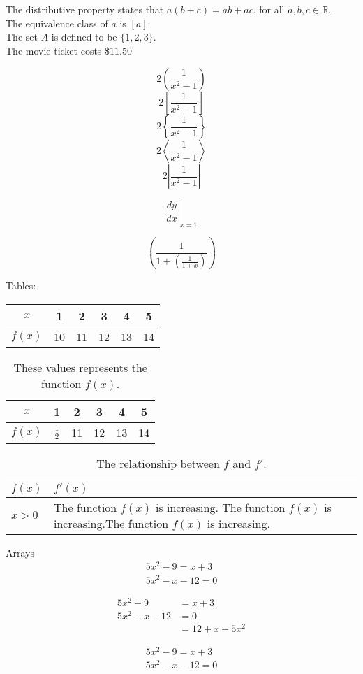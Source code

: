 \documentclass[11pt]{article}
\begin{document}
The distributive property states that $a(b+c)=ab +ac$, for all
$a,b, c \in \mathbb{R}$.\\[6pt] 
The equivalence class of $a$ is $[a]$.\\[6pt]
The set $A$ is defined to be $\{1, 2, 3\}$.\\[6pt]
The movie ticket costs $\$11.50$  %

$$2\left(\frac{1}{x^2-1}\right)$$ %
$$2\left[\frac{1}{x^2-1}\right]$$
$$2\left\{\frac{1}{x^2-1}\right\}$$
$$2\left\langle    \frac{1}{x^2-1}\right\rangle  $$ %
$$2\left|\frac{1}{x^2-1}\right|$$

$$\left.\frac{dy}{dx}\right|_{x=1}$$ %

$$\left(\frac{1}{1+\left(\frac{1}{1+x}\right)}\right)$$ %

Tables:\\

\begin{tabular}{|c|c|c|c|c|c|}  %
\hline
$x$ & 1 & 2 & 3 & 4 & 5 \\ \hline  %
$f(x)$ & 10 & 11 & 12 & 13 & 14 \\ \hline  
\end{tabular}

\vspace{1cm}

\begin{table}[H]  %
\centering
\def\arraystretch{1.2}   %
\begin{tabular}{|c|c|c|c|c|c|}  %
\hline
$x$ & 1 & 2 & 3 & 4 & 5 \\ \hline  %
$f(x)$ & $\frac{1}{2}$ & 11 & 12 & 13 & 14 \\ \hline  
\end{tabular}
\caption{These values represents the function $f(x)$.}
\end{table}


\begin{table}[H]  %
\centering
\caption{The relationship between $f$ and $f'$.}
\def\arraystretch{1.2}   %
\begin{tabular}{|l|p{6cm}|}  %
\hline
$f(x)$ & $f'(x)$ \\ \hline  %
$x>0$ & The function $f(x)$ is increasing. The function $f(x)$ is increasing.The function $f(x)$ is increasing. \\ \hline  
\end{tabular}

\end{table}





Arrays
\begin{align}
5x^2 -9 = x+3\\
5x^2-x-12=0  
\end{align}

\begin{align*} 
5x^2 -9 &= x+3\\
5x^2-x-12&=0 \\
&=12+x-5x^2 
\end{align*}

\begin{align}
5x^2 -9 = x+3\\
5x^2-x-12=0  
\end{align}
\end{document}
